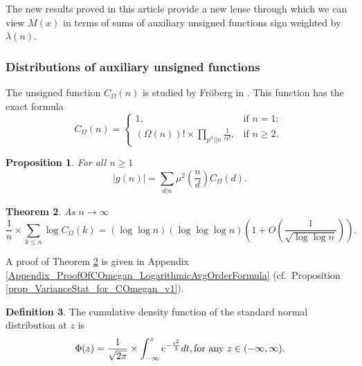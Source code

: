 \documentclass[11pt,reqno,a4letter]{article}
\newcommand{\hlocalref}[1]{\hyperref[#1]{\ref{#1}}}
\numberwithin{equation}{section}
\numberwithin{figure}{section}
\numberwithin{table}{section}
\newcommand{\cf}{cf.~}
\theoremstyle{plain}
\newtheorem{theorem}{Theorem}
\newtheorem{prop}[theorem]{Proposition}
\numberwithin{theorem}{section}
\theoremstyle{definition}
\newtheorem{definition}[theorem]{Definition}
\theoremstyle{remark}
\newcommand{\mathtext}[1]{\text{\rm #1}}
\begin{document}
The new results proved in this article 
provide a new lense through which we can view $M(x)$ 
in terms of sums of auxiliary unsigned functions sign weighted by $\lambda(n)$. 

\subsubsection{Distributions of auxiliary unsigned functions}

The unsigned function $C_{\Omega}(n)$ is studied by Fr\"oberg in 
\cite{FROBERG-1968}. This function has the exact formula 
\begin{equation}
\label{eqn_proof_tag_hInvn_ExactNestedSumFormula_CombInterpetIdent_v3}
C_{\Omega}(n) = \begin{cases}
     1, & \text{if $n = 1$; } \\ 
     (\Omega(n))! \times \prod\limits_{p^{\alpha}||n} \frac{1}{\alpha!}, & \text{if $n \geq 2$. }
     \end{cases}
\end{equation} 

\begin{prop} 
\label{lemma_AbsValueOf_gInvn_FornSquareFree_v1} 
For all $n \geq 1$ 
\begin{equation} 
\label{eqn_AbsValueOf_gInvn_FornSquareFree_v1} 
|g(n)| = \sum_{d|n} \mu^2\left(\frac{n}{d}\right) C_{\Omega}(d). 
\end{equation} 
\end{prop} 

\begin{theorem} 
\label{lemma_HatCAstxSum_ExactFormulaWithError_v1} 
As $n \rightarrow \infty$ 
\[
\frac{1}{n} \times \sum_{k \leq n} \log C_{\Omega}(k) = 
     (\log\log n)(\log\log\log n) \left(1 + 
     O\left(\frac{1}{\sqrt{\log\log n}}\right)\right). 
\] 
\end{theorem} 

A proof of Theorem \hlocalref{lemma_HatCAstxSum_ExactFormulaWithError_v1} is 
given in Appendix \hlocalref{Appendix_ProofOfCOmegan_LogarithmicAvgOrderFormula} 
(\cf Proposition \hlocalref{prop_VarianceStat_for_COmegan_v1}). 

\begin{definition}
The cumulative density function of the 
standard normal distribution at $z$ is 
\[
\Phi(z) = \frac{1}{\sqrt{2\pi}} \times \int_{-\infty}^{z} e^{-\frac{t^2}{2}} dt, 
     \mathtext{ for any } z \in (-\infty, \infty). 
\]
\end{definition}
\end{document}
